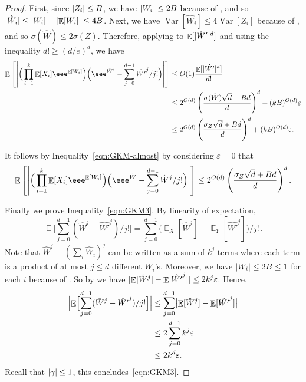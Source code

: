 \documentclass{toc}
\def\eps{\varepsilon}
\DeclarePairedDelimiter{\abs}{\lvert}{\rvert}
\DeclareMathOperator*{\E}{\mathbb{E}}                 %
\DeclareMathOperator*{\Var}{Var}                 %
\begin{document}
\begin{proof}
    First, since $\abs{Z_i} \le B$, we have $\abs{W_i} \le 2B$ because of , and so $\abs{\hat W_i} \le \abs{W_i} + \abs{\E[W_i]} \le 4B$.
    Next, we have $\Var[\hat W_i] \le 4 \Var[Z_i]$ because of , and so $\sigma(\hat W) \le 2 \sigma(Z)$.
    Therefore, applying  to $\E[\abs{\hat W'}^d]$ and using the inequality $d! \ge (d/e)^d$, we have
    \begin{align}
      \E \left[ \abs*{ \Big( \prod_{i = 1}^k \E[X_i] \eee^{\E[W_i]} \Big) \Big( \eee^{\hat W'} - \sum_{j = 0}^{d-1} {\hat {W'}}^j / j! \Big) } \right]
      &\le O(1) \frac{ \E[ \abs{\hat {W'}}^d ] }{ d! } \nonumber \\
      &\le 2^{O(d)} \left( \frac{ \sigma(\hat W) \sqrt{d} + B d }{ d } \right)^d + (kB)^{O(d)} \eps \nonumber \\
      &\le 2^{O(d)} \left( \frac{ \sigma_Z \sqrt{d} + B d }{ d } \right)^d + (kB)^{O(d)} \eps . \label{eqn:GKM-almost}
    \end{align}

    \medskip

    It follows by Inequality~\eqref{eqn:GKM-almost} by considering $\eps = 0$ that
    \begin{align*}
      \E \left[ \abs*{ \Big( \prod_{i = 1}^k \E[X_i] \eee^{\E[W_i]} \Big) \Big( \eee^{\hat W} - \sum_{j = 0}^{d-1} {\hat W}^j / j! \Big) } \right]
      \le 2^{O(d)} \left( \frac{ \sigma_Z \sqrt{d} + Bd }{ d } \right)^d  .
    \end{align*}

    \medskip

    Finally we prove Inequality~\eqref{eqn:GKM3}.
    By linearity of expectation,
    \[
      \E \Big[ \sum_{j = 0}^{d-1} (\hat W^j - {\hat {W'}}^j) / j! \Big]
      = \sum_{j = 0}^{d-1} \bigl( \E_X[\hat W^j] - \E_Y[{\hat {W'}}^j] \bigr) / j!\, .
    \]
    Note that $\hat W^j = ( \sum_i \hat W_i )^j$ can be written as a sum of
    $k^j$ terms where each term is a product of at most $j \le d$ different
    $W_i$'s.
    Moreover, we have $\abs{W_i} \le 2B \le 1$ for each $i$ because of .
    So by  we have $\abs{ \E[\hat W^j] - \E[\hat {W'}^j] } \le 2 k^j \eps$.
    Hence,
    \begin{align*}
      \Bigl| \E \Bigl[ \sum_{j = 0}^{d-1} (\hat W^j - {\hat {W'}}^j) / j! \Bigr] \Bigr|
        &\le \sum_{j = 0}^{d-1} \bigl| \E[\hat W^j] - \E[{\hat {W'}}^j] \bigr| \\
        &\le 2 \sum_{j = 0}^{d-1} k^j \eps \\
        &\le 2 k^d \eps .
    \end{align*}
    Recall that $\abs{\gamma} \le 1$, this concludes~\eqref{eqn:GKM3}.
  \end{proof}
\end{document}
